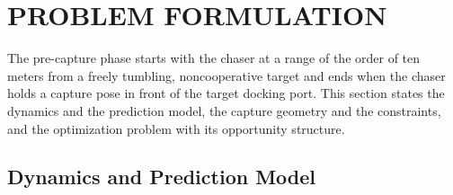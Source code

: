 \section{PROBLEM FORMULATION}\label{sec:problem}

The pre-capture phase starts with the chaser at a range of the order of ten meters from a freely tumbling, noncooperative target and ends when the chaser holds a capture pose in front of the target docking port. This section states the dynamics and the prediction model, the capture geometry and the constraints, and the optimization problem with its opportunity structure.

\subsection{Dynamics and Prediction Model}\label{sec:dynamics}

